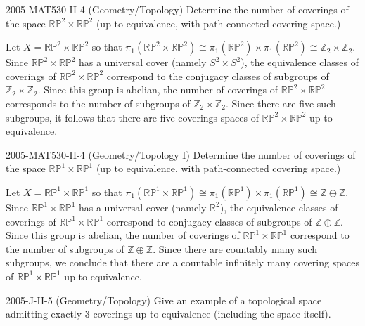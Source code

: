 \documentclass{article}
\begin{document}
\begin{prb}{2005-MAT530-II-4 (Geometry/Topology)}
	Determine the number of coverings of the space $\mathbb{RP}^{2} \times \mathbb{RP}^{2}$ (up to equivalence, with path-connected covering space.)
\end{prb}
\begin{solutions}
	Let $X= \mathbb{RP}^{2} \times \mathbb{RP}^{2}$ so that $\pi_{1}(\mathbb{RP}^{2} \times \mathbb{RP}^{2}) \cong \pi_{1}(\mathbb{RP}^{2}) \times \pi_{1}(\mathbb{RP}^{2}) \cong \mathbb{Z}_{2} \times \mathbb{Z}_{2}$. Since $\mathbb{RP}^{2} \times \mathbb{RP}^{2}$ has a universal cover (namely $S^{2} \times S^{2}$), the equivalence classes of coverings of $\mathbb{RP}^{2} \times \mathbb{RP}^{2}$ correspond to the conjugacy classes of subgroups of $\mathbb{Z}_{2} \times \mathbb{Z}_{2}$. Since this group is abelian, the number of coverings of $\mathbb{RP}^{2} \times \mathbb{RP}^{2}$ corresponds to the number of subgroups of $\mathbb{Z}_{2} \times \mathbb{Z}_{2}$. Since there are five such subgroups, it follows that there are five coverings spaces of $\mathbb{RP}^{2} \times \mathbb{RP}^{2}$ up to equivalence. 
\end{solutions}
\begin{prb}{2005-MAT530-II-4 (Geometry/Topology I)}
	Determine the number of coverings of the space $\mathbb{RP}^{1} \times \mathbb{RP}^{1}$ (up to equivalence, with path-connected covering space.)
\end{prb}
\begin{solutions}
	Let $X = \mathbb{RP}^{1} \times \mathbb{RP}^{1}$ so that $\pi_{1}(\mathbb{RP}^{1} \times \mathbb{RP}^{1}) \cong \pi_{1}(\mathbb{RP}^{1}) \times \pi_{1}(\mathbb{RP}^{1}) \cong \mathbb{Z} \oplus \mathbb{Z}$. Since $\mathbb{RP}^{1} \times \mathbb{RP}^{1}$ has a universal cover (namely $\mathbb{R}^{2}$), the equivalence classes of coverings of $\mathbb{RP}^{1} \times \mathbb{RP}^{1}$ correspond to conjugacy classes of subgroups of $\mathbb{Z} \oplus \mathbb{Z}$. Since this group is abelian, the number of coverings of $\mathbb{RP}^{1} \times \mathbb{RP}^{1}$ correspond to the number of subgroups of $\mathbb{Z} \oplus \mathbb{Z}$. Since there are countably many such subgroups, we conclude that there are a countable infinitely many covering spaces of $\mathbb{RP}^{1} \times \mathbb{RP}^{1}$ up to equivalence. 
\end{solutions} 
\begin{prb}{2005-J-II-5 (Geometry/Topology)}
	Give an example of a topological space admitting exactly 3 coverings up to equivalence (including the space itself). 
\end{prb}
\end{document}
